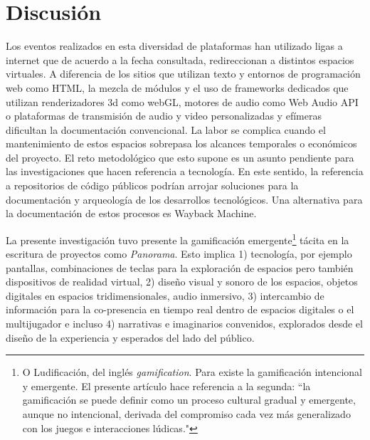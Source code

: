 
\section*{Discusión}

Los eventos realizados en esta diversidad de plataformas han utilizado ligas a internet que de acuerdo a la fecha consultada, redireccionan a distintos espacios virtuales. A diferencia de los sitios que utilizan texto y entornos de programación web como HTML, la mezcla de módulos y el uso de frameworks dedicados que utilizan renderizadores 3d como webGL, motores de audio como Web Audio API o plataformas de transmisión de audio y video personalizadas y efímeras dificultan la documentación convencional. La labor se complica cuando el mantenimiento de estos espacios sobrepasa los alcances temporales o económicos del proyecto. El reto metodológico que esto supone es un asunto pendiente para las investigaciones que hacen referencia a tecnología. En este sentido, la referencia a repositorios de código públicos podrían arrojar soluciones para la documentación y arqueología de los desarrollos tecnológicos. Una alternativa para la documentación de estos procesos es Wayback Machine.  %

La presente investigación tuvo presente la gamificación emergente\footnote{O Ludificación, del inglés \textit{gamification}. Para \cite{gamificacion} existe la gamificación intencional y emergente. El presente artículo hace referencia a la segunda: ``la gamificación se puede definir como un proceso cultural gradual y emergente, aunque no intencional, derivada del compromiso cada vez más generalizado con los juegos e interacciones lúdicas."} tácita en la escritura de proyectos como \textit{Panorama}. Esto implica 1) tecnología, por ejemplo pantallas, combinaciones de teclas para la exploración de espacios pero también dispositivos de realidad virtual, 2) diseño visual y sonoro de los espacios, objetos digitales en espacios tridimensionales, audio inmersivo, 3) intercambio de información para la co-presencia en tiempo real dentro de espacios digitales o el multijugador e incluso 4) narrativas e imaginarios convenidos, explorados desde el diseño de la experiencia y esperados del lado del público. 



